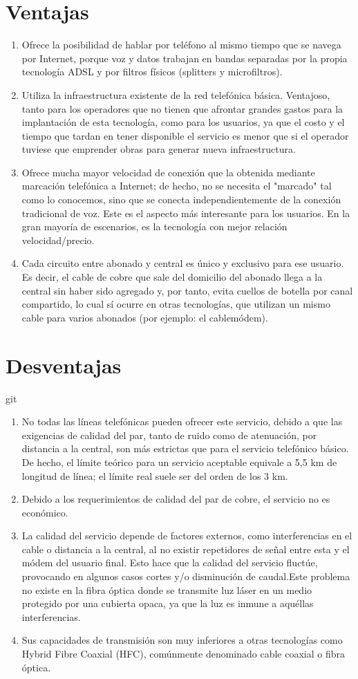 \documentclass{report}
\begin{document}
\section*{Ventajas}
\begin{enumerate}
\item Ofrece la posibilidad de hablar por teléfono al mismo tiempo que se navega por Internet, porque voz y datos trabajan en bandas separadas por la propia tecnología ADSL y por filtros físicos (splitters y microfiltros).
\item Utiliza la infraestructura existente de la red telefónica básica. Ventajoso, tanto para los operadores que no tienen que afrontar grandes gastos para la implantación de esta tecnología, como para los usuarios, ya que el costo y el tiempo que tardan en tener disponible el servicio es menor que si el operador tuviese que emprender obras para generar nueva infraestructura.
\item Ofrece mucha mayor velocidad de conexión que la obtenida mediante marcación telefónica a Internet; de hecho, no se necesita el "marcado" tal como lo conocemos, sino que se conecta independientemente de la conexión tradicional de voz. Este es el aspecto más interesante para los usuarios. En la gran mayoría de escenarios, es la tecnología con mejor relación velocidad/precio.
\item Cada circuito entre abonado y central es único y exclusivo para ese usuario. Es decir, el cable de cobre que sale del domicilio del abonado llega a la central sin haber sido agregado y, por tanto, evita cuellos de botella por canal compartido, lo cual sí ocurre en otras tecnologías, que utilizan un mismo cable para varios abonados (por ejemplo: el cablemódem).
\end{enumerate}
\section*{Desventajas}git 
\begin{enumerate}
\item No todas las líneas telefónicas pueden ofrecer este servicio, debido a que las exigencias de calidad del par, tanto de ruido como de atenuación, por distancia a la central, son más estrictas que para el servicio telefónico básico. De hecho, el límite teórico para un servicio aceptable equivale a 5,5 km de longitud de línea; el límite real suele ser del orden de los 3 km.
\item Debido a los requerimientos de calidad del par de cobre, el servicio no es económico.
\item La calidad del servicio depende de factores externos, como interferencias en el cable o distancia a la central, al no existir repetidores de señal entre esta y el módem del usuario final. Esto hace que la calidad del servicio fluctúe, provocando en algunos casos cortes y/o disminución de caudal.Este problema no existe en la fibra óptica donde se transmite luz láser en un medio protegido por una cubierta opaca, ya que la luz es inmune a aquéllas interferencias.
\item Sus capacidades de transmisión son muy inferiores a otras tecnologías como Hybrid Fibre Coaxial (HFC), comúnmente denominado cable coaxial o fibra óptica.
\end{enumerate}
\newpage
\end{document}

